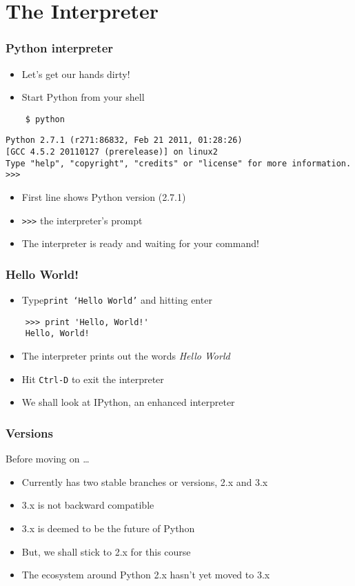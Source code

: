 \section{The Interpreter}
\begin{frame}[fragile]
  \frametitle{Python interpreter} 
  \begin{itemize}
  \item Let's get our hands dirty!
  \item Start Python from your shell
  \end{itemize}
  \lstset{language=sh}
  \begin{lstlisting}
    $ python
  \end{lstlisting} %
  \begin{lstlisting}
Python 2.7.1 (r271:86832, Feb 21 2011, 01:28:26) 
[GCC 4.5.2 20110127 (prerelease)] on linux2
Type "help", "copyright", "credits" or "license" for more information.
>>>
  \end{lstlisting}
  \begin{itemize}
  \item First line shows Python version (2.7.1)
  \item \verb+>>>+ the interpreter's prompt
  \item The interpreter is ready and waiting for your command!
  \end{itemize}
\end{frame}

\begin{frame}[fragile]
  \frametitle{Hello World!}
  \begin{itemize}
  \item Type\texttt{print `Hello World'} and hitting enter
  \end{itemize}
  \begin{lstlisting}
    >>> print 'Hello, World!'
    Hello, World!
  \end{lstlisting}
  \begin{itemize}
  \item The interpreter prints out the words \emph{Hello World}
  \end{itemize}
  \begin{itemize}
  \item Hit \texttt{Ctrl-D} to exit the interpreter
  \item We shall look at IPython, an enhanced interpreter
  \end{itemize}
\end{frame}

\begin{frame}[fragile]
  \frametitle{Versions}
  Before moving on \ldots
  \begin{itemize}
  \item Currently has two stable branches or versions, 2.x and 3.x
  \item 3.x is not backward compatible 
  \item 3.x is deemed to be the future of Python
  \item But, we shall stick to 2.x for this course
  \item The ecosystem around Python 2.x hasn't yet moved to 3.x
  \end{itemize}
\end{frame}

